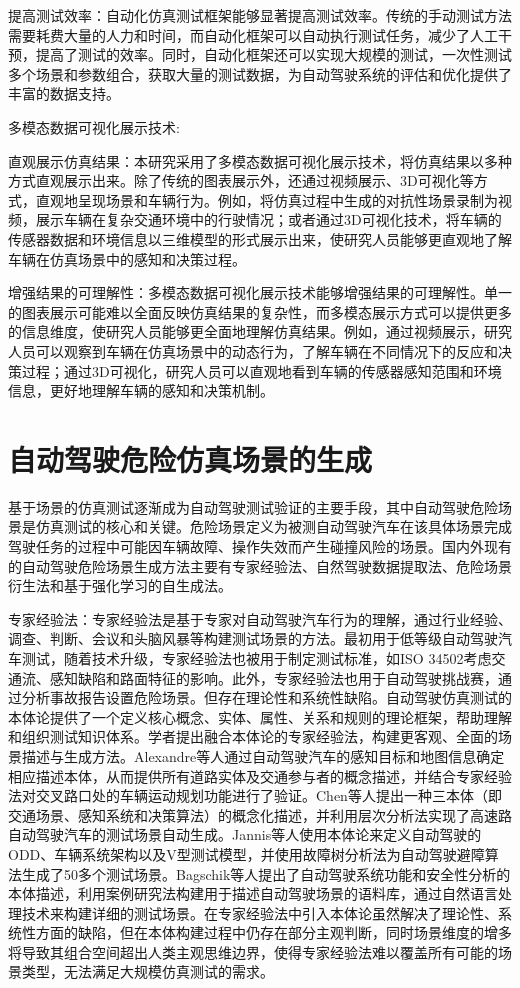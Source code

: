 提高测试效率：自动化仿真测试框架能够显著提高测试效率。传统的手动测试方法需要耗费大量的人力和时间，而自动化框架可以自动执行测试任务，减少了人工干预，提高了测试的效率。同时，自动化框架还可以实现大规模的测试，一次性测试多个场景和参数组合，获取大量的测试数据，为自动驾驶系统的评估和优化提供了丰富的数据支持。

多模态数据可视化展示技术:

直观展示仿真结果：本研究采用了多模态数据可视化展示技术，将仿真结果以多种方式直观展示出来。除了传统的图表展示外，还通过视频展示、3D可视化等方式，直观地呈现场景和车辆行为。例如，将仿真过程中生成的对抗性场景录制为视频，展示车辆在复杂交通环境中的行驶情况；或者通过3D可视化技术，将车辆的传感器数据和环境信息以三维模型的形式展示出来，使研究人员能够更直观地了解车辆在仿真场景中的感知和决策过程。

增强结果的可理解性：多模态数据可视化展示技术能够增强结果的可理解性。单一的图表展示可能难以全面反映仿真结果的复杂性，而多模态展示方式可以提供更多的信息维度，使研究人员能够更全面地理解仿真结果。例如，通过视频展示，研究人员可以观察到车辆在仿真场景中的动态行为，了解车辆在不同情况下的反应和决策过程；通过3D可视化，研究人员可以直观地看到车辆的传感器感知范围和环境信息，更好地理解车辆的感知和决策机制。




\section{自动驾驶危险仿真场景的生成}

基于场景的仿真测试逐渐成为自动驾驶测试验证的主要手段，其中自动驾驶危险场景是仿真测试的核心和关键。危险场景定义为被测自动驾驶汽车在该具体场景完成驾驶任务的过程中可能因车辆故障、操作失效而产生碰撞风险的场景。国内外现有的自动驾驶危险场景生成方法主要有专家经验法、自然驾驶数据提取法、危险场景衍生法和基于强化学习的自生成法。


专家经验法：专家经验法是基于专家对自动驾驶汽车行为的理解，通过行业经验、调查、判断、会议和头脑风暴等构建测试场景的方法。最初用于低等级自动驾驶汽车测试，随着技术升级，专家经验法也被用于制定测试标准，如ISO 34502考虑交通流、感知缺陷和路面特征的影响。此外，专家经验法也用于自动驾驶挑战赛，通过分析事故报告设置危险场景。但存在理论性和系统性缺陷。自动驾驶仿真测试的本体论提供了一个定义核心概念、实体、属性、关系和规则的理论框架，帮助理解和组织测试知识体系。学者提出融合本体论的专家经验法，构建更客观、全面的场景描述与生成方法。Alexandre等人通过自动驾驶汽车的感知目标和地图信息确定相应描述本体，从而提供所有道路实体及交通参与者的概念描述，并结合专家经验法对交叉路口处的车辆运动规划功能进行了验证。Chen等人提出一种三本体（即交通场景、感知系统和决策算法）的概念化描述，并利用层次分析法实现了高速路自动驾驶汽车的测试场景自动生成。Jannis等人使用本体论来定义自动驾驶的ODD、车辆系统架构以及V型测试模型，并使用故障树分析法为自动驾驶避障算法生成了50多个测试场景。Bagschik等人提出了自动驾驶系统功能和安全性分析的本体描述，利用案例研究法构建用于描述自动驾驶场景的语料库，通过自然语言处理技术来构建详细的测试场景。在专家经验法中引入本体论虽然解决了理论性、系统性方面的缺陷，但在本体构建过程中仍存在部分主观判断，同时场景维度的增多将导致其组合空间超出人类主观思维边界，使得专家经验法难以覆盖所有可能的场景类型，无法满足大规模仿真测试的需求。


